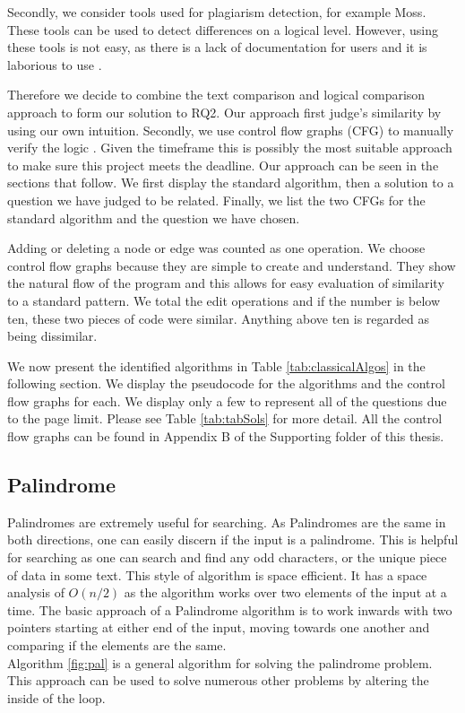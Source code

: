 \documentclass[conference]{IEEEtran}
\begin{document}
\par Secondly, we consider tools used for plagiarism detection, for example Moss. These tools can be used to detect differences on a logical level. However, using these tools is not easy, as there is a lack of documentation for users and it is laborious to use \cite{mosswebsite}. 
\par Therefore we decide to combine the text comparison and logical comparison approach to form our solution to RQ2. Our approach first judge's similarity by using our own intuition. Secondly, we use control flow graphs (CFG) to manually verify the logic \cite{softwaretesting}. Given the timeframe this is possibly the most suitable approach to make sure this project meets the deadline. Our approach can be seen in the sections that follow. We first display the standard algorithm, then a solution to a question we have judged to be related. Finally, we list the two CFGs for the standard algorithm and the question we have chosen. 
\par Adding or deleting a node or edge was counted as one operation. We choose control flow graphs because they are simple to create and understand. They show the natural flow of the program and this allows for easy evaluation of similarity to a standard pattern. We total the edit operations and if the number is below ten, these two pieces of code were similar. Anything above ten is regarded as being dissimilar.
\par We now present the identified algorithms in Table \ref{tab:classicalAlgos} in the following section. We display the pseudocode for the algorithms and the control flow graphs for each. We display only a few to represent all of the questions due to the page limit. Please see Table \ref{tab:tabSols} for more detail. All the control flow graphs can be found in Appendix B of the Supporting folder of this thesis.
\subsection{Palindrome}
Palindromes are extremely useful for searching. As Palindromes are the same in both directions, one can easily discern if the input is a palindrome. This is helpful for searching as one can search and find any odd characters, or the unique piece of data in some text. This style of algorithm is space efficient. It has a space analysis of $O(n/2)$ as the algorithm works over two elements of the input at a time. The basic approach of a Palindrome algorithm is to work inwards with two pointers starting at either end of the input, moving towards one another and comparing if the elements are the same.\\ 
Algorithm \ref{fig:pal} is a general algorithm for solving the palindrome problem. This approach can be used to solve numerous other problems by altering the inside of the loop.
\end{document}
